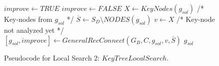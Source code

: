 \documentclass{llncs}
\begin{document}
 


%


\begin{figure}[H]
\begin{algorithm}[H]
\caption{$g_{sol} = KeyTreeLocalSearch(G_B,C,g_{sol})$}
\begin{algorithmic}[1]
\STATE $improve \leftarrow TRUE$
\STATE $improve \leftarrow FALSE$
\STATE $ X \leftarrow KeyNodes(g_{sol})$ /* Key-nodes from $g_{sol}$ */
\STATE $\overline{S} \leftarrow S_D \setminus NODES(g_{sol})$
\STATE $v \leftarrow X$ /* Key-node not analyzed yet */
\STATE $[g_{sol},improve] \leftarrow GeneralRecConnect(G_B,C,g_{sol},v,\overline{S})$
\ENDWHILE
\ENDWHILE
\RETURN $g_{sol}$
\end{algorithmic}
\end{algorithm}
\caption{Pseudocode for Local Search 2: $KeyTreeLocalSearch$.\label{alg-ktls}}
\end{figure}
\end{document}
